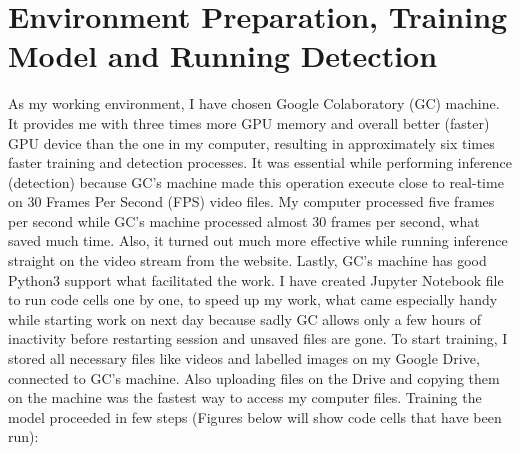 \section{Environment Preparation, Training Model and Running Detection}
\label{sec:env}
As my working environment, I have chosen Google Colaboratory (GC) machine. It provides me with three times more GPU memory and overall better (faster) GPU device than the one in my computer, resulting in approximately six times faster training and detection processes. It was essential while performing inference (detection) because GC's machine made this operation execute close to real-time on 30 Frames Per Second (FPS) video files. My computer processed five frames per second while GC's machine processed almost 30 frames per second, what saved much time. Also, it turned out much more effective while running inference straight on the video stream from the website. Lastly, GC's machine has good Python3 support what facilitated the work. I have created Jupyter Notebook file to run code cells one by one, to speed up my work, what came especially handy while starting work on next day because sadly GC allows only a few hours of inactivity before restarting session and unsaved files are gone. To start training, I stored all necessary files like videos and labelled images on my Google Drive, connected to GC's machine. Also uploading files on the Drive and copying them on the machine was the fastest way to access my computer files. Training the model proceeded in few steps (Figures below will show code cells that have been run):
